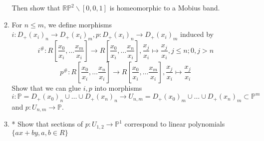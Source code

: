 \documentclass[a4paper,11pt]{article}
\def\bb#1{\mathbb{#1}}
\begin{document}
\begin{enumerate}[1.]
\begin{enumerate}
    Then show that $\bb{R}\bb{P}^2\backslash[0,0,1]$ is homeomorphic to a Mobius band.
    \item  For $n\leq m$, we define morphisms $i: D_+(x_i)_n\to D_+(x_i)_m, p:D_+(x_i)_n\to D_+(x_i)_m$ induced by 
    \[i^\#:R[\frac{x_0}{x_i},\ldots \frac{x_m}{x_i}]\to R[\frac{x_0}{x_i},\ldots \frac{x_n}{x_i}],  \frac{x_j}{x_i} \mapsto \frac{x_j}{x_i}, j\leq n; 0 , j>n \]
    \[p^\#: R[\frac{x_0}{x_i},\ldots \frac{x_n}{x_i}]\to R[\frac{x_0}{x_i},\ldots \frac{x_m}{x_i}],  \frac{x_j}{x_i} \mapsto \frac{x_j}{x_i}\] 
    Show that we can glue $i,p$ into morphisms 
    \[i:\bb{P}= D_+(x_0)_n\cup \ldots \cup D_+(x_n)_n \to U_{n,m}= D_+(x_0)_m\cup \ldots  \cup D_+(x_n)_m \subset \bb{P}^m \]
    and $p:U_{n,m}\to \bb{P}$.
    \item* Show that sections of $p:U_{1,2}\to \bb{P}^1$ correspond to linear polynomials $\{ ax+by, a,b\in R \}$
\end{enumerate}



\end{enumerate}
\end{document}
